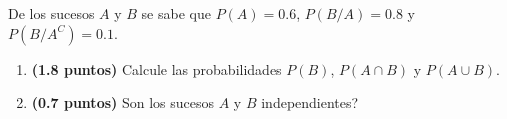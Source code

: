 
De los sucesos $A$ y $B$ se sabe que $P(A)=0.6$, $P(B/A)=0.8$ y $P(B/A^C)=0.1$.
\begin{enumerate}[label=\alph*)]
\item \textbf{(1.8 puntos)} Calcule las probabilidades $P(B)$, $P(A\cap B)$ y $P(A\cup B)$.
\item \textbf{(0.7 puntos)} \textquestiondown{}Son los sucesos $A$ y $B$ independientes?
\end{enumerate}
